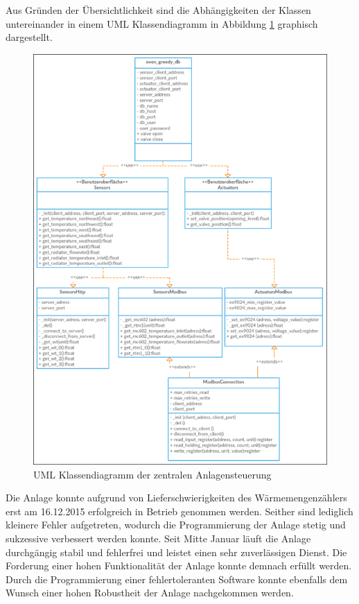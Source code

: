 Aus Gründen der Übersichtlichkeit sind die Abhängigkeiten der Klassen untereinander in einem UML Klassendiagramm in Abbildung \ref{fig:uml} graphisch dargestellt. 
\begin{figure}
\centering
\includegraphics[width=\textwidth]{abbildungen/20160327_uml}
\caption{UML Klassendiagramm der zentralen Anlagensteuerung}
\label{fig:uml}
\end{figure}

Die Anlage konnte aufgrund von Lieferschwierigkeiten des Wärmemengenzählers erst am 16.12.2015 erfolgreich in Betrieb genommen werden. Seither sind lediglich kleinere Fehler aufgetreten, wodurch die Programmierung der Anlage stetig und sukzessive verbessert werden konnte.
Seit Mitte Januar läuft die Anlage durchgängig stabil und fehlerfrei und leistet einen sehr zuverlässigen Dienst.
Die Forderung einer hohen Funktionalität der Anlage konnte demnach erfüllt werden. Durch die Programmierung einer fehlertoleranten Software konnte ebenfalls dem Wunsch einer hohen Robustheit der Anlage nachgekommen werden.

